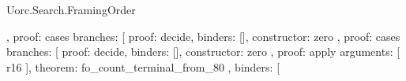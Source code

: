 \begin{lexlean}{Uorc.Search.FramingOrder}
\begin{semanticmodule}
{{{{{{{{{{{{{{{{{{{{{{{{{{{{{                                                                                    },
                                                                                    {
                                                                                      proof: cases{
                                                                                        branches: [
                                                                                          {
                                                                                            proof: decide{},
                                                                                            binders: [],
                                                                                            constructor: zero
                                                                                          },
                                                                                          {
                                                                                            proof: cases{
                                                                                              branches: [
                                                                                                {
                                                                                                  proof: decide{},
                                                                                                  binders: [],
                                                                                                  constructor: zero
                                                                                                },
                                                                                                {
                                                                                                  proof: apply{
                                                                                                    arguments: [
                                                                                                      r16
                                                                                                    ],
                                                                                                    theorem: fo_count_terminal_from_80
                                                                                                  },
                                                                                                  binders: [
}}}}}}}}}}}}}}}}}}}}}}}}}}}}}}}}}
\end{semanticmodule}
\end{lexlean}
